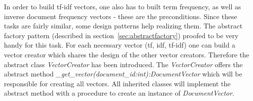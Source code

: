 \noindent
In order to build tf-idf vectors, one also has to built term frequency, as well as inverse document frequency vectors - these are the preconditions.
Since these tasks are fairly similar, some design patterns help realizing them.
The abstract factory pattern (described in section~\ref{sec:abstractfactory}) proofed to be very handy for this task.
For each necessary vector (tf, idf, tf-idf) one can build a vector creator which shares the design of the other vector creators.
Therefore the abstract class \textit{VectorCreator} has been introduced.
The \textit{VectorCreator} offers the abstract method \textit{\_get\_vector(document\_id:int):DocumentVector} which will be responsible for creating all vectors.
All inherited classes will implement the abstract method with a procedure to create an instance of \textit{DocumentVector}.

